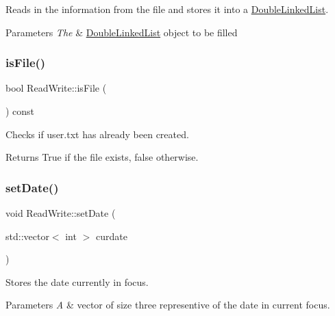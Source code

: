 Reads in the information from the file and stores it into a \hyperlink{class_double_linked_list}{Double\+Linked\+List}. 


\begin{DoxyParams}{Parameters}
{\em The} & \hyperlink{class_double_linked_list}{Double\+Linked\+List} object to be filled \\
\hline
\end{DoxyParams}
\hypertarget{class_read_write_af93a5b21f22c6db3d50361b5fd99c668}{}\label{class_read_write_af93a5b21f22c6db3d50361b5fd99c668} 
\subsubsection{\texorpdfstring{is\+File()}{isFile()}}
{\footnotesize\ttfamily bool Read\+Write\+::is\+File (\begin{DoxyParamCaption}{ }\end{DoxyParamCaption}) const}



Checks if user.\+txt has already been created. 

\begin{DoxyReturn}{Returns}
True if the file exists, false otherwise. 
\end{DoxyReturn}
\hypertarget{class_read_write_a22a0b16f5004c059980424203c84978a}{}\label{class_read_write_a22a0b16f5004c059980424203c84978a} 
\subsubsection{\texorpdfstring{set\+Date()}{setDate()}}
{\footnotesize\ttfamily void Read\+Write\+::set\+Date (\begin{DoxyParamCaption}\item[{std\+::vector$<$ int $>$}]{curdate }\end{DoxyParamCaption})}



Stores the date currently in focus. 


\begin{DoxyParams}{Parameters}
{\em A} & vector of size three representive of the date in current focus. \\
\hline
\end{DoxyParams}
\hypertarget{class_read_write_a323d8e4f3bf72f0ef4726b3c08f0f4c3}{}\label{class_read_write_a323d8e4f3bf72f0ef4726b3c08f0f4c3} 
